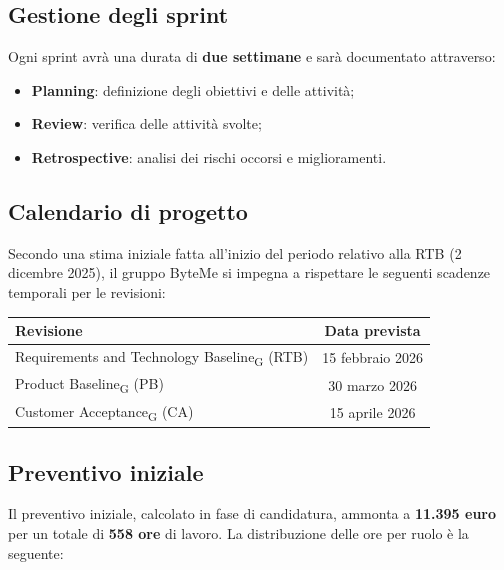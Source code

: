 \documentclass[11pt,a4paper]{article}
\begin{document}
\subsection{Gestione degli sprint}
Ogni sprint avrà una durata di \textbf{due settimane} e sarà documentato attraverso:
\begin{itemize}
    \item \textbf{Planning}: definizione degli obiettivi e delle attività;
    \item \textbf{Review}: verifica delle attività svolte;
    \item \textbf{Retrospective}: analisi dei rischi occorsi e miglioramenti.
\end{itemize}

\subsection{Calendario di progetto}
Secondo una stima iniziale fatta all'inizio del periodo relativo alla RTB (2 dicembre 2025), il gruppo ByteMe si impegna a rispettare le seguenti scadenze temporali per le revisioni:
\begin{center}
    \begin{tabular}{|l|c|}
        \hline
        \textbf{Revisione} & \textbf{Data prevista} \\
        \hline
        Requirements and Technology Baseline\textsubscript{G} (RTB) & 15 febbraio 2026 \\
        \hline
        Product Baseline\textsubscript{G} (PB) & 30 marzo 2026 \\
        \hline
        Customer Acceptance\textsubscript{G} (CA) & 15 aprile 2026 \\
        \hline
    \end{tabular}
\end{center}

\subsection{Preventivo iniziale}
Il preventivo iniziale, calcolato in fase di candidatura, ammonta a \textbf{11.395 euro} per un totale di \textbf{558 ore} di lavoro. La distribuzione delle ore per ruolo è la seguente:
\end{document}
